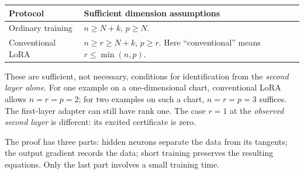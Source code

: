 \documentclass[12pt,a4paper]{article}
\theoremstyle{readable}
\theoremstyle{definition}\newtheorem{example}[theorem]{Example}
\begin{document}
\begin{center}
\begin{tabular}{@{}p{37mm}p{102mm}@{}}
\toprule Protocol & Sufficient dimension assumptions\\\midrule
Ordinary training & \(n\ge N+k\), \(p\ge N\).\\
Conventional LoRA & \(n\ge r\ge N+k\), \(p\ge r\). Here ``conventional'' means \(r\le\min(n,p)\).\\\bottomrule
\end{tabular}
\end{center}
These are sufficient, not necessary, conditions for identification from the \emph{second layer alone}. For one example on a one-dimensional chart, conventional LoRA allows \(n=r=p=2\); for two examples on such a chart, \(n=r=p=3\) suffices. The first-layer adapter can still have rank one. The case \(r=1\) at the \emph{observed second layer} is different: its excited certificate is zero.

The proof has three parts: hidden neurons separate the data from its tangents; the output gradient records the data; short training preserves the resulting equations. Only the last part involves a small training time.
\end{document}
